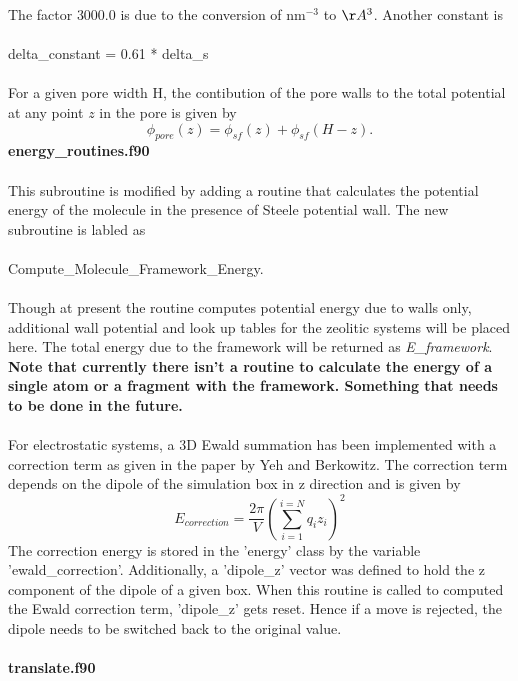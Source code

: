 %
The factor $3000.0$ is due to the conversion of nm$^{-3}$ to $\AA^3$. 
Another constant is \\ \\
%
delta\_constant = 0.61 * delta\_s \\ \\
%
For a given pore width H, the contibution of the pore walls to the
total potential at any point $z$ in the pore is given by 
\begin{equation}
\phi_{pore}(z) = \phi_{sf}(z) + \phi_{sf}(H-z).
\label{Eq:Total_Wall_Potential}
\end{equation}
%
{\bf energy\_routines.f90} \\ \\
%
This subroutine is modified by adding a routine that calculates the 
potential energy of the molecule in the presence of Steele potential
wall. The new subroutine is labled as \\ \\
%
Compute\_Molecule\_Framework\_Energy. \\ \\
%
Though at present the routine computes potential energy due to
walls only, additional wall potential and look up tables for the
zeolitic systems will be placed here. The total energy due to the framework
will be returned as {\em E\_framework}. {\bf Note that currently there isn't
 a routine to calculate the energy of a single atom or a fragment
with the framework. Something that needs to be done in the future.} \\ \\
%
For electrostatic systems, a 3D Ewald summation has been implemented
with a correction term as given in the paper by Yeh and Berkowitz. The
correction term depends on the dipole of the simulation box in z
direction and is given by
%
\begin{equation}
E_{correction} = \frac {2\pi} {V} \left ( \sum_{i = 1}^{i=N} q_i z_i \right )^2
\end{equation}
The correction energy is stored in the 'energy' class by the variable
'ewald\_correction'. Additionally, a 'dipole\_z' vector was defined to
hold the z component of the dipole of a given box. When this routine
is called to computed the Ewald correction term, 'dipole\_z' gets
reset. Hence if a move is rejected, the dipole needs to be switched
back to the original value. \\ \\
%
{\bf translate.f90} \\ \\
